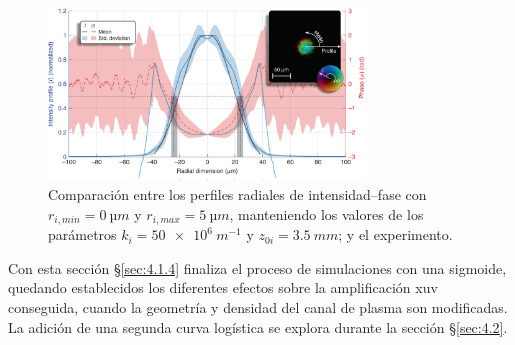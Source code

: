 \begin{figure}[htbp]
  \centering
  \includegraphics[width=0.75\textwidth]{Figuras/ch4_cmp32.png}
  \caption{Comparación entre los perfiles radiales de intensidad--fase con $r_{i,min}=\qty{0}{µm}$ y $r_{i,max}=\qty{5}{µm}$, manteniendo los valores de los parámetros $k_{i}=\qty{50e6}{m^{-1}}$ y $z_{0i}=\qty{3.5}{mm}$; y el experimento.}
  \label{fig:4.18}
\end{figure}

Con esta sección \S\ref{sec:4.1.4} finaliza el proceso de simulaciones con una sigmoide, quedando establecidos los diferentes efectos sobre la amplificación \acrshort{xuv} conseguida, cuando la geometría y densidad del canal de plasma son modificadas. La adición de una segunda curva logística se explora durante la sección \S\ref{sec:4.2}.

